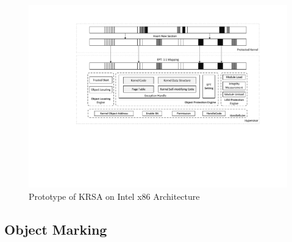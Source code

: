 \documentclass[conference]{IEEEtran}
\begin{document}
\begin{figure}
    \centering
    \includegraphics[scale=0.5]{pic/frame.pdf}
    \caption{Prototype of KRSA on Intel x86 Architecture}
    \label{frame}
\end{figure}


\subsection{Object Marking} \label{section:aggre}
\end{document}
